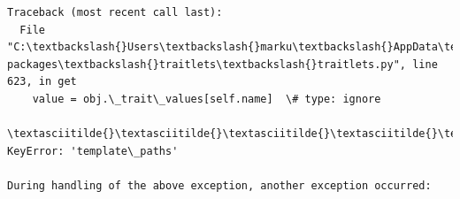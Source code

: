 \documentclass[11pt]{article}
\begin{document}
    \begin{Verbatim}[commandchars=\\\{\}]
Traceback (most recent call last):
  File "C:\textbackslash{}Users\textbackslash{}marku\textbackslash{}AppData\textbackslash{}Roaming\textbackslash{}Python\textbackslash{}Python311\textbackslash{}site-
packages\textbackslash{}traitlets\textbackslash{}traitlets.py", line 623, in get
    value = obj.\_trait\_values[self.name]  \# type: ignore
            \textasciitilde{}\textasciitilde{}\textasciitilde{}\textasciitilde{}\textasciitilde{}\textasciitilde{}\textasciitilde{}\textasciitilde{}\textasciitilde{}\textasciitilde{}\textasciitilde{}\textasciitilde{}\textasciitilde{}\textasciitilde{}\textasciitilde{}\textasciitilde{}\textasciitilde{}\^{}\^{}\^{}\^{}\^{}\^{}\^{}\^{}\^{}\^{}\^{}
KeyError: 'template\_paths'

During handling of the above exception, another exception occurred:


\end{Verbatim}
\end{document}
